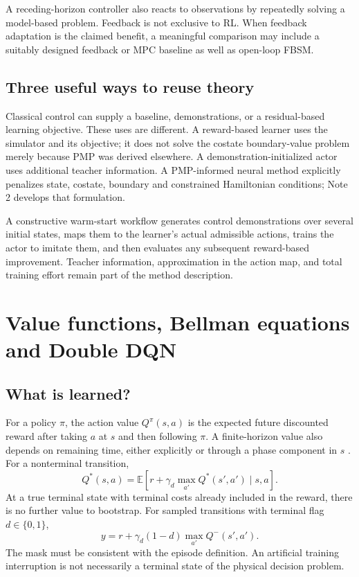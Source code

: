 \documentclass[11pt,a4paper]{article}
\newcommand{\E}{\mathbb E}
\theoremstyle{definition}
\theoremstyle{remark}
\begin{document}
A receding-horizon controller also reacts to observations by repeatedly solving a model-based problem. Feedback is not exclusive to RL. When feedback adaptation is the claimed benefit, a meaningful comparison may include a suitably designed feedback or MPC baseline as well as open-loop FBSM.

\subsection{Three useful ways to reuse theory}
Classical control can supply a baseline, demonstrations, or a residual-based learning objective. These uses are different. A reward-based learner uses the simulator and its objective; it does not solve the costate boundary-value problem merely because PMP was derived elsewhere. A demonstration-initialized actor uses additional teacher information. A PMP-informed neural method explicitly penalizes state, costate, boundary and constrained Hamiltonian conditions; Note 2 develops that formulation.

A constructive warm-start workflow generates control demonstrations over several initial states, maps them to the learner's actual admissible actions, trains the actor to imitate them, and then evaluates any subsequent reward-based improvement. Teacher information, approximation in the action map, and total training effort remain part of the method description.

\section{Value functions, Bellman equations and Double DQN}
\subsection{What is learned?}
For a policy $\pi$, the action value $Q^\pi(s,a)$ is the expected future discounted reward after taking $a$ at $s$ and then following $\pi$. A finite-horizon value also depends on remaining time, either explicitly or through a phase component in $s$ \cite{sutton}. For a nonterminal transition,
\begin{equation}
Q^*(s,a)=\E\left[r+\gamma_d\max_{a'}Q^*(s',a')\mid s,a\right].
\end{equation}
At a true terminal state with terminal costs already included in the reward, there is no further value to bootstrap. For sampled transitions with terminal flag $d\in\{0,1\}$,
\begin{equation}
y=r+\gamma_d(1-d)\max_{a'}Q^-(s',a').
\end{equation}
The mask must be consistent with the episode definition. An artificial training interruption is not necessarily a terminal state of the physical decision problem.
\end{document}
